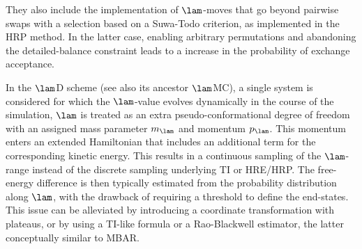 %
%
%
They also include the implementation of $\lam$-moves that go beyond pairwise swaps with a selection based on a Suwa-Todo criterion\cite{SU10.4,TO13.7,MO15.11}, as implemented in the HRP method\cite{IT13.1,IT13.2,YA17.2}. In the latter case, enabling arbitrary permutations and abandoning the detailed-balance constraint leads to a  increase in the probability of exchange acceptance.


In the $\lam$D scheme \cite{KO96.1,DA01.7,GU03.1,KN09.1,KN11.2,DO11.2,AR15.2,HA17.1} (see also its ancestor\cite{TI93.2,LI93.1} $\lam$MC), a single system is considered for which the $\lam$-value evolves dynamically in the course of the simulation, \ie{} $\lam$ is treated as an extra pseudo-conformational degree of freedom with an assigned mass parameter $m_{\lam}$ and momentum $p_{\lam}$. This momentum enters an extended Hamiltonian that includes an additional term for the corresponding kinetic energy. This results in a continuous sampling of the $\lam$-range instead of the discrete sampling underlying TI or HRE/HRP. The free-energy difference is then typically estimated from the probability distribution along $\lam$, with the drawback of requiring a threshold to define the end-states\cite{KN11.1}. This issue can be alleviated by introducing a coordinate transformation with plateaus\cite{BI14.1,BI15.2}, or by using a TI-like formula\cite{KA05.1,KA06.6,KA12.5} or a Rao-Blackwell estimator\cite{DI17.5}, the latter conceptually similar to MBAR. 

